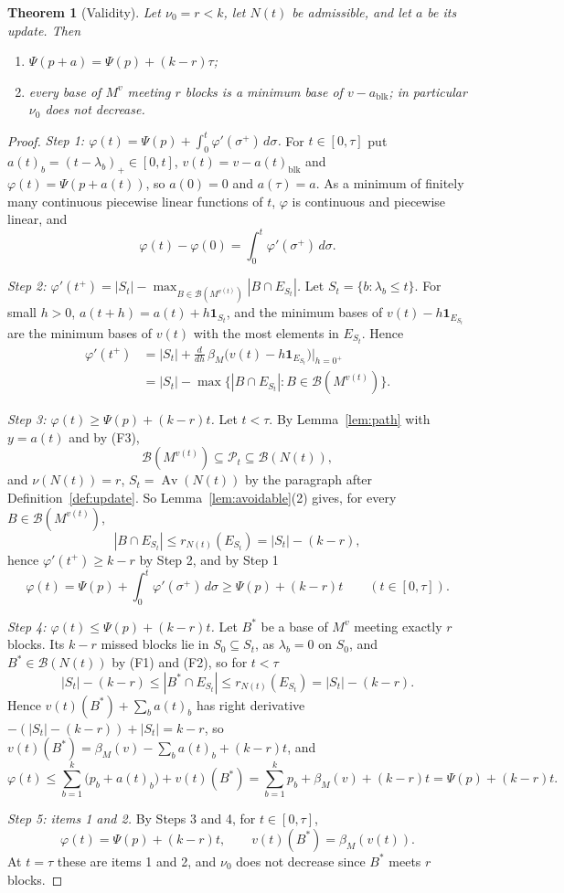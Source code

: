 \documentclass[11pt]{article}
\newtheorem{theorem}{Theorem}[section]
\newcommand{\blk}{\operatorname{blk}}
\newcommand{\Bases}{\mathcal B}
\newcommand{\Pos}{\mathcal P}
\newcommand{\Av}{\operatorname{Av}}
\begin{document}
\begin{theorem}[Validity]
\label{thm:validity}
Let $\nu_0=r<k$, let $N(t)$ be admissible, and let $a$ be its update.  Then
\begin{enumerate}
  \item $\Psi(p+a)=\Psi(p)+(k-r)\tau$;
  \item every base of $M^{v}$ meeting $r$ blocks is a minimum base of
        $v-a_{\blk}$; in particular $\nu_0$ does not decrease.
\end{enumerate}
\end{theorem}

\begin{proof}
\emph{Step 1: $\varphi(t)=\Psi(p)+\int_0^{t}\varphi'(\sigma^{+})\,d\sigma$.}  For $t\in[0,\tau]$ put $a(t)_b=(t-\lambda_b)_+\in[0,t]$,
$v(t)=v-a(t)_{\blk}$ and $\varphi(t)=\Psi(p+a(t))$, so $a(0)=0$ and $a(\tau)=a$.
As a minimum of finitely many continuous piecewise linear functions of $t$,
$\varphi$ is continuous and piecewise linear, and
\[
  \varphi(t)-\varphi(0)=\int_0^{t}\varphi'(\sigma^{+})\,d\sigma.
\]

\emph{Step 2: $\varphi'(t^{+})=|S_t|-\max_{B\in\Bases(M^{v(t)})}|B\cap E_{S_t}|$.}  Let $S_t=\{b:\lambda_b\le t\}$.  For small
$h>0$, $a(t+h)=a(t)+h\mathbf 1_{S_t}$, and the minimum bases of
$v(t)-h\mathbf 1_{E_{S_t}}$ are the minimum bases of $v(t)$ with the most elements
in $E_{S_t}$.  Hence
\[
  \begin{aligned}
  \varphi'(t^{+})&=|S_t|+\frac{d}{dh}\,\beta_M\bigl(v(t)-h\mathbf 1_{E_{S_t}}\bigr)\Big|_{h=0^{+}}\\
  &=|S_t|-\max\bigl\{|B\cap E_{S_t}|:B\in\Bases(M^{v(t)})\bigr\}.
  \end{aligned}
\]

\emph{Step 3: $\varphi(t)\ge\Psi(p)+(k-r)t$.}  Let $t<\tau$.  By Lemma~\ref{lem:path} with
$y=a(t)$ and by (F3),
\[
  \Bases(M^{v(t)})\subseteq\Pos_t\subseteq\Bases(N(t)),
\]
and $\nu(N(t))=r$, $S_t=\Av(N(t))$ by the paragraph after
Definition~\ref{def:update}.  So Lemma~\ref{lem:avoidable}(2) gives, for every
$B\in\Bases(M^{v(t)})$,
\[
  |B\cap E_{S_t}|\le r_{N(t)}(E_{S_t})=|S_t|-(k-r),
\]
hence $\varphi'(t^{+})\ge k-r$ by Step 2, and by Step 1
\[
  \varphi(t)=\Psi(p)+\int_0^{t}\varphi'(\sigma^{+})\,d\sigma\ge\Psi(p)+(k-r)t\qquad(t\in[0,\tau]).
\]

\emph{Step 4: $\varphi(t)\le\Psi(p)+(k-r)t$.}  Let $B^{*}$ be a base of $M^{v}$ meeting exactly $r$
blocks.  Its $k-r$ missed blocks lie in $S_0\subseteq S_t$, as $\lambda_b=0$ on
$S_0$, and $B^{*}\in\Bases(N(t))$ by (F1) and (F2), so for $t<\tau$
\[
  |S_t|-(k-r)\le|B^{*}\cap E_{S_t}|\le r_{N(t)}(E_{S_t})=|S_t|-(k-r).
\]
Hence $v(t)(B^{*})+\sum_ba(t)_b$ has right derivative
$-(|S_t|-(k-r))+|S_t|=k-r$, so
$v(t)(B^{*})=\beta_M(v)-\sum_ba(t)_b+(k-r)t$, and
\[
  \varphi(t)\le\sum_{b=1}^{k}\bigl(p_b+a(t)_b\bigr)+v(t)(B^{*})
  =\sum_{b=1}^{k}p_b+\beta_M(v)+(k-r)t=\Psi(p)+(k-r)t.
\]

\emph{Step 5: items 1 and 2.}  By Steps 3 and 4, for $t\in[0,\tau]$,
\[
  \varphi(t)=\Psi(p)+(k-r)t,\qquad v(t)(B^{*})=\beta_M(v(t)).
\]
At $t=\tau$ these are items 1 and 2, and $\nu_0$ does not decrease since $B^{*}$
meets $r$ blocks.
\end{proof}
\end{document}

